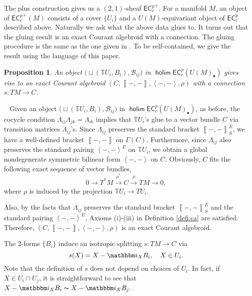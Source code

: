 \documentclass[letterpaper,10pt, oneside]{article} %
\newtheorem{pro}[thm]{Proposition}
\newcommand{\ecalgdp}{\mathsf{EC}^{p}_{c}} %
\newcommand{\ecalgdpp}{{\mathsf{EC}^{p}_{c}}^+} %
\DeclareMathOperator{\holim}{\mathsf{holim}}
\newcommand{\tangui}{{\mathbb{T} U_i}}
\newcommand{\taof}[1]{\mathbb{T}{#1}}
\newcommand{\pf}{\noindent{\bf Proof.}\ }
\newcommand{\ii}{\mathbbm i}
\newcommand{\huaB}{\mathcal{B}}%
\def\qed{\hfill ~\vrule height6pt width6pt depth0pt}
\newcommand{\pair}[1]{\left\langle #1\right\rangle}
\newcommand{\Courant}[1]{\left\llbracket  #1\right\rrbracket }
\begin{document}
The plus construction gives us a $(2,1)$-sheaf $\ecalgdpp$. For a manifold $M$, an
object of $\ecalgdpp(M)$ consists of a cover $\{U_i\}$ and a
$U(M)$-equivariant object of $\ecalgdp$ described above. Naturally
we ask what the above data glues to. It turns out that the gluing result is an exact Courant
algebroid with a connection. The gluing procedure is the same as the one given in \cite{Rogers:prequan}. To be self-contained, we give the result using the language of this paper.



\begin{pro}\label{thm:eco}\label{pro:eco}
An object  $\Big(\sqcup (\tangui,
 B_i),\huaB_{ij}\Big)$ in $\holim \ecalgdp(U(M)_\bullet)$  gives rise to an exact Courant algebroid $(C,\Courant{-,-},\pair{-,-},\rho)$ with a connection $s:TM\longrightarrow C$.
\end{pro}
\pf
Given an object $\Big(\sqcup (\tangui,
  B_i),\huaB_{ij}\Big)$ in $\holim\ecalgdp(U(M)_\bullet)$, as before,  the cocycle condition $\Lambda_{ij}\Lambda_{jk}=\Lambda_{ik}$ implies that $\taof{U_i}$'s glue to a vector bundle $C$ via transition matrices $\Lambda_{ij}$'s.
Since $\Lambda_{ij}$ preserves the standard bracket $\Courant{-,-}^E_S$, we have a well-defined bracket $\Courant{-,-}$ on $\Gamma(C)$.
Furthermore, since $\Lambda_{ij}$ also preserves the standard pairing $\pair{-,-}^E$ on $\tangui$, we obtain a global nondegenerate symmetric bilinear form $\pair{-,-}$ on $C$.
Obviously, $C$ fits the following exact sequence of vector bundles,
$$
0\longrightarrow T^*M  \stackrel{\rho^*}{\longrightarrow}C \stackrel{\rho} {\longrightarrow } TM\longrightarrow 0,
$$
where $\rho$ is induced by the projection $\tangui\longrightarrow TU_i$.

Also, by the facts that $\Lambda_{ij}$ preserves  the standard bracket $\Courant{-,-}^E_S$ and the standard pairing $\pair{-,-}^E$, Axioms (i)-(iii) in Definition \ref{defi:ca} are satisfied. Therefore, $(C,\Courant{-,-},\pair{-,-},\rho)$ is an exact Courant algebroid.


The 2-forms $\{B_i\}$ induce an isotropic splitting $s:TM\longrightarrow C$ via
$$
s(X)=X-\ii_XB_i, \quad X\in U_i.
$$
Note that the definition of $s$ does not depend on choices of $U_i$. In fact, if $X\in U_i\cap U_j$, it is straightforward to see that $X-\ii_XB_i \thicksim X-\ii_XB_j$. \qed\vspace{3mm}
\end{document}
